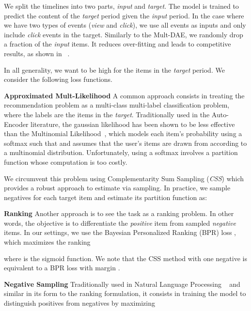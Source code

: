 \documentclass[sigconf]{acmart}
\begin{document}
We split the timelines into two parts, \emph{input} and \emph{target}. The model is trained to predict the content of the \emph{target} period given the \emph{input} period. In the case where we have two types of events (\emph{view} and \emph{click}), we use all events as inputs and only include \emph{click} events in the target. Similarly to the Mult-DAE, we randomly drop a fraction of the \emph{input} items. It reduces over-fitting and leads to competitive results, as shown in ~\cite{variational-liang-2018}.

In all generality, we want  to be high for the items in the \emph{target} period. We consider the following loss functions.










\textbf{Approximated Mult-Likelihood} A common approach consists in treating the recommendation problem as a multi-class multi-label classification problem, where the labels are the items in the \emph{target}. Traditionally used in the Auto-Encoder literature, the gaussian likelihood has been shown to be less effective than the Multinomial Likelihood~\cite{variational-liang-2018}, which models each item's probability using a softmax such that  and assumes that the user's items are drawn from  according to a multinomial distribution. Unfortunately, using a softmax involves a partition function  whose computation is too costly.





We circumvent this problem using Complementarity Sum Sampling (\emph{CSS}) \cite{pmlr-v54-botev17a} which provides a robust approach to estimate  via sampling. In practice, we sample  negatives for each target item  and estimate its partition function as:


\textbf{Ranking} Another approach is to see the task as a ranking problem. In other words, the objective is to differentiate the \emph{positive} item from sampled \emph{negative} items. In our settings, we use the Bayesian Personalized Ranking (BPR) loss \cite{rendle2009bpr}, which maximizes the ranking

where  is the sigmoid function. We note that the CSS method with one negative is equivalent to a BPR loss with margin .

\textbf{Negative Sampling} Traditionally used in Natural Language Processing ~\cite{NIPS2013_5021} and similar in its form to the ranking formulation, it consists in training the model to distinguish positives from negatives by maximizing
\end{document}
